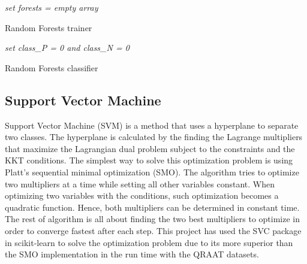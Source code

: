 \documentclass[twoside]{article}
\begin{document}
\IncMargin{1em}
\begin{algorithm}
\BlankLine
\emph{set forests = empty array}\;
\caption{Random Forests trainer}\label{RFt}
\end{algorithm}\DecMargin{1em}

\IncMargin{1em}
\begin{algorithm}
\BlankLine
\emph{set class\_P = 0 and class\_N = 0}\;
\caption{Random Forests classifier}\label{RFc}
\end{algorithm}\DecMargin{1em}

\subsection{Support Vector Machine}
Support Vector Machine (SVM) is a method that uses a hyperplane to separate two classes. The hyperplane is calculated by the finding the Lagrange multipliers that maximize the Lagrangian dual problem subject to the constraints and the KKT conditions. The simplest way to solve this optimization problem is using Platt's sequential minimal optimization (SMO). The algorithm tries to optimize two multipliers at a time while setting all other variables constant. When optimizing two variables with the conditions, such optimization becomes a quadratic function. Hence, both multipliers can be determined in constant time. The rest of algorithm is all about finding the two best multipliers to optimize in order to converge fastest after each step. This project has used the SVC package in scikit-learn to solve the optimization problem due to its more superior than the SMO implementation in the run time with the QRAAT datasets.
\end{document}
